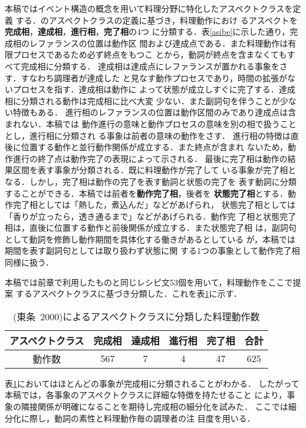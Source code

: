 本稿ではイベント構造の概念を用いて料理分野に特化したアスペクトクラスを定義
する．\cite{tojo11,tojo2}のアスペクトクラスの定義に基づき，料理動作におけ
るアスペクトを{\bf 完成相}，{\bf 達成相}，{\bf 進行相}，{\bf 完了相}の4つ
に分類する．表\ref{asibe}に示した通り，完成相のレファランスの位置は動作区
間および達成点である．また料理動作は有限プロセスであるため必ず終点をもつこ
とから，動詞が終点を含まなくてもすべて完成相に分類する．
達成相は達成点にレファランスが置かれる事象をさす．すなわち調理者が達成した
と見なす動作プロセスであり，時間の拡張がないプロセスを指す．達成相は動作に
よって状態が成立しすぐに完了する．達成相に分類される動作は完成相に比べ大変
少ない．また副詞句を伴うことが少ない特徴もある．
進行相のレファランスの位置は動作区間のみであり達成点は含まれない．本稿では
動作進行の意味と動作プロセスの意味を別の相で扱うこととし，進行相に分類され
る事象は前者の意味の動作をさす．
進行相の特徴は直後に位置する動作と並行動作関係が成立する．また終点が含まれ
ないため，動作進行の終了点は動作完了の表現によって示される．
最後に完了相は動作の結果区間を表す事象が分類される．既に料理動作が完了して
いる事象が完了相となる．しかし，完了相は動作の完了を表す動詞と状態の完了を
表す動詞に分類することができる．本稿では前者を{\bf 動作完了相}，後者を{\bf 
状態完了相}とする．動作完了相としては「熱した，煮込んだ」などがあげられ，
状態完了相としては「香りが立ったら，透き通るまで」などがあげられる．動作完
了相と状態完了相は，直後に位置する動作と前後関係が成立する．また状態完了相
は，副詞句として動詞を修飾し動作期間を具体化する働きがあるとしている
\cite{karlin,uematu}が，本稿では期間を表す副詞句としては取り扱わず状態に関
する1つの事象として動作完了相同様に扱う．

本稿では前章で利用したものと同じレシピ文53個を用いて，料理動作をここで提案
するアスペクトクラスに基づき分類した．これを表\ref{tab:2}に示す．
\begin{table}[t]
\begin{center}
 \caption{(東条~2000)によるアスペクトクラスに分類した料理動作数}
 \label{tab:2}
    \begin{tabular}{|c||c|c|c|c|c|} \hline
     アスペクトクラス & 完成相 & 達成相 & 進行相 & 完了相 & 合計 \\ \hline
     動作数           &   567  &    7   &    4   &   47   & 625  \\ \hline
    \end{tabular}
\end{center}
\end{table}
表\ref{tab:2}においてはほとんどの事象が完成相に分類されることがわかる．
したがって本稿では，各事象のアスペクトクラスに詳細な特徴を持たせること
により，事象の隣接関係が明確になることを期待し完成相の細分化を試みた．
ここでは細分化に際し，動詞の素性と料理動作毎の調理者の注
目度を用いる．



